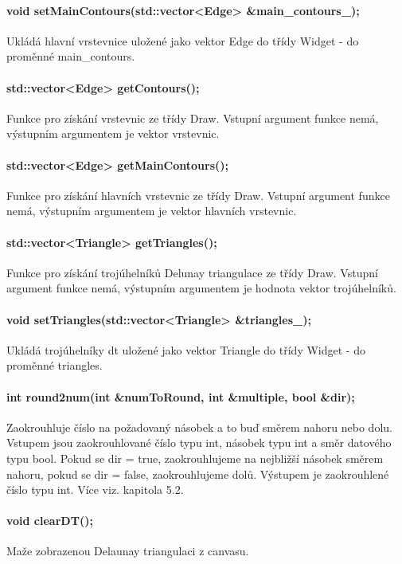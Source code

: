 \documentclass[11pt]{article}
\begin{document}
\paragraph {void setMainContours(std::vector<Edge> \&main\_contours\_);}
Ukládá hlavní vrstevnice uložené jako vektor Edge do třídy Widget - do proměnné main\_contours.

\paragraph {std::vector<Edge> getContours();}
Funkce pro získání vrstevnic ze třídy Draw. Vstupní argument funkce nemá, výstupním argumentem je vektor vrstevnic.

\paragraph {std::vector<Edge> getMainContours();}
Funkce pro získání hlavních vrstevnic ze třídy Draw. Vstupní argument funkce nemá, výstupním argumentem je vektor hlavních vrstevnic.

\paragraph {std::vector<Triangle> getTriangles();}
Funkce pro získání trojúhelníků Delunay triangulace ze třídy Draw. Vstupní argument funkce nemá, výstupním argumentem je hodnota vektor trojúhelníků.

\paragraph {void setTriangles(std::vector<Triangle> \&triangles\_);}
Ukládá trojúhelníky dt uložené jako vektor Triangle do třídy Widget - do proměnné triangles.

\paragraph{int round2num(int \&numToRound, int \&multiple, bool \&dir);} 
Zaokrouhluje číslo na požadovaný násobek a to buď směrem nahoru nebo dolu. Vstupem jsou zaokrouhlované číslo typu int,  násobek typu int a směr datového typu bool. Pokud se dir = true, zaokrouhlujeme na nejbližší násobek směrem nahoru, pokud se dir = false, zaokrouhlujeme dolů. Výstupem je zaokrouhlené číslo typu int. Více viz. kapitola  5.2. 

\paragraph {void clearDT();}
Maže zobrazenou Delaunay triangulaci z canvasu.
\end{document}
